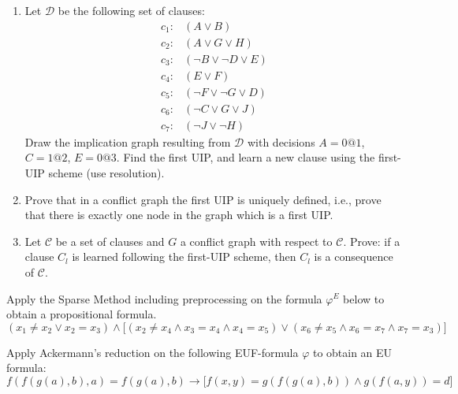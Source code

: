 \documentclass[11pt,a4paper]{uebung}
\begin{document}

\newpage
{}
\begin{enumerate}
\item Let $\mathcal{D}$ be the following set of clauses:
  \begin{align*}
    c_1:& (A \lor B)\\
    c_2:& (A \lor G \lor H)\\
    c_3:& (\neg B \lor \neg D \lor E)\\
    c_4:& (E \lor F)\\
    c_5:& (\neg F \lor \neg G \lor D)\\
    c_6:& (\neg C \lor G \lor J)\\
    c_7:& (\neg J \lor \neg H)
  \end{align*}
  Draw the implication graph resulting from $\mathcal{D}$ with decisions
  $A=0@1$, $C=1@2$, $E=0@3$. Find the first UIP, and learn a new clause using
  the first-UIP scheme (use resolution).



\item Prove that in a conflict graph the first UIP is uniquely defined, i.e.,
  prove that there is exactly one node in the graph which is a first UIP.

 

\item Let $\mathcal{C}$ be a set of clauses and $G$ a conflict graph with
  respect to $\mathcal{C}$. Prove: if a clause $C_l$ is learned following the
  first-UIP scheme, then $C_l$ is a consequence of $\mathcal{C}$.



\end{enumerate}



\newpage
{}
Apply the Sparse Method including preprocessing on the formula $\varphi^E$
below to obtain a propositional formula.
\begin{displaymath}
  (x_1 \neq x_2 \lor x_2=x_3 ) \land \big[ (x_2 \neq x_4 \land x_3=x_4
  \land x_4=x_5)
  \lor (x_6 \neq x_5 \land x_6=x_7 \land x_7=x_3)\big]
\end{displaymath}






\newpage
{}
Apply Ackermann's reduction on the following EUF-formula $\varphi$ to obtain
an EU formula:
\begin{displaymath}
  f\left(f\left(g\left(a\right),b\right),a\right) = f(g(a),b) \rightarrow \big[ f(x,y) = g(f(g(a),b)) \land
  g(f(a,y))=d \big]
\end{displaymath}


\end{document}
